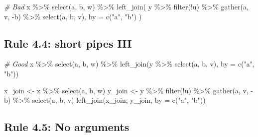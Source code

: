 \documentclass[
  letterpaper,
  DIV=11,
  numbers=noendperiod]{scrreprt}
\newenvironment{Shaded}{}{}
\newcommand{\AttributeTok}[1]{\textcolor[rgb]{0.49,0.56,0.16}{#1}}
\newcommand{\CommentTok}[1]{\textcolor[rgb]{0.38,0.63,0.69}{\textit{#1}}}
\newcommand{\FunctionTok}[1]{\textcolor[rgb]{0.02,0.16,0.49}{#1}}
\newcommand{\NormalTok}[1]{#1}
\newcommand{\OtherTok}[1]{\textcolor[rgb]{0.00,0.44,0.13}{#1}}
\newcommand{\SpecialCharTok}[1]{\textcolor[rgb]{0.25,0.44,0.63}{#1}}
\newcommand{\StringTok}[1]{\textcolor[rgb]{0.25,0.44,0.63}{#1}}
\begin{document}
\begin{Shaded}
\begin{Highlighting}[]
\CommentTok{\# Bad}
\NormalTok{x }\SpecialCharTok{\%\textgreater{}\%}
  \FunctionTok{select}\NormalTok{(a, b, w) }\SpecialCharTok{\%\textgreater{}\%}
  \FunctionTok{left\_join}\NormalTok{(}
\NormalTok{    y }\SpecialCharTok{\%\textgreater{}\%} \FunctionTok{filter}\NormalTok{(}\SpecialCharTok{!}\NormalTok{u) }\SpecialCharTok{\%\textgreater{}\%} \FunctionTok{gather}\NormalTok{(a, v, }\SpecialCharTok{{-}}\NormalTok{b) }\SpecialCharTok{\%\textgreater{}\%} \FunctionTok{select}\NormalTok{(a, b, v),}
    \AttributeTok{by =} \FunctionTok{c}\NormalTok{(}\StringTok{"a"}\NormalTok{, }\StringTok{"b"}\NormalTok{)}
\NormalTok{  )}
\end{Highlighting}
\end{Shaded}

\subsection{Rule 4.4: short pipes III}\label{rule-4.4-short-pipes-iii}

\begin{Shaded}
\begin{Highlighting}[]
\CommentTok{\# Good}
\NormalTok{x }\SpecialCharTok{\%\textgreater{}\%}
  \FunctionTok{select}\NormalTok{(a, b, w) }\SpecialCharTok{\%\textgreater{}\%}
  \FunctionTok{left\_join}\NormalTok{(y }\SpecialCharTok{\%\textgreater{}\%} \FunctionTok{select}\NormalTok{(a, b, v), }\AttributeTok{by =} \FunctionTok{c}\NormalTok{(}\StringTok{"a"}\NormalTok{, }\StringTok{"b"}\NormalTok{))}

\NormalTok{x\_join }\OtherTok{\textless{}{-}}
\NormalTok{  x }\SpecialCharTok{\%\textgreater{}\%}
  \FunctionTok{select}\NormalTok{(a, b, w)}
\NormalTok{y\_join }\OtherTok{\textless{}{-}}
\NormalTok{  y }\SpecialCharTok{\%\textgreater{}\%}
  \FunctionTok{filter}\NormalTok{(}\SpecialCharTok{!}\NormalTok{u) }\SpecialCharTok{\%\textgreater{}\%}
  \FunctionTok{gather}\NormalTok{(a, v, }\SpecialCharTok{{-}}\NormalTok{b) }\SpecialCharTok{\%\textgreater{}\%}
  \FunctionTok{select}\NormalTok{(a, b, v)}
\FunctionTok{left\_join}\NormalTok{(x\_join, y\_join, }\AttributeTok{by =} \FunctionTok{c}\NormalTok{(}\StringTok{"a"}\NormalTok{, }\StringTok{"b"}\NormalTok{))}
\end{Highlighting}
\end{Shaded}

\subsection{Rule 4.5: No arguments}\label{rule-4.5-no-arguments}
\end{document}
